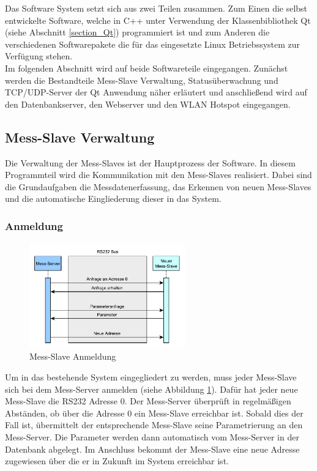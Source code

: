 Das Software System setzt sich aus zwei Teilen zusammen. Zum Einen die selbst entwickelte Software, welche in C++ unter Verwendung der Klassenbibliothek Qt (siehe Abschnitt \ref{section_Qt}) programmiert ist und zum Anderen die verschiedenen Softwarepakete die für das eingesetzte Linux Betriebssystem zur Verfügung stehen.\\
Im folgenden Abschnitt wird auf beide Softwareteile eingegangen. Zunächst werden die Bestandteile Mess-Slave Verwaltung, Statusüberwachung und TCP/UDP-Server der Qt Anwendung näher erläutert und anschließend wird auf den Datenbankserver, den Webserver und den WLAN Hotspot eingegangen.

\subsection{Mess-Slave Verwaltung}
\label{section_messclientverwaltung}
Die Verwaltung der Mess-Slaves ist der Hauptprozess der Software. In diesem Programmteil wird die Kommunikation mit den Mess-Slaves realisiert. Dabei sind die Grundaufgaben die Messdatenerfassung, das Erkennen von neuen Mess-Slaves und die automatische Eingliederung dieser in das System.

\subsubsection{Anmeldung}

\begin{figure}[H]
\begin{center}
\includegraphics[width=0.6\textwidth ]{img/general/MessClientAnmeldung.pdf}
\caption{Mess-Slave Anmeldung}
\label{figure_MessClientAnmeldung}
\end{center}
\end{figure}
 
 
Um in das bestehende System eingegliedert zu werden, muss jeder Mess-Slave sich bei dem Mess-Server anmelden (siehe Abbildung \ref{figure_MessClientAnmeldung}). Dafür hat jeder neue Mess-Slave die RS232 Adresse 0. Der Mess-Server überprüft in regelmäßigen Abständen, ob über die Adresse 0 ein Mess-Slave erreichbar ist. Sobald dies der Fall ist, übermittelt der entsprechende Mess-Slave seine Parametrierung an den Mess-Server. Die Parameter werden dann automatisch vom Mess-Server in der Datenbank abgelegt. Im Anschluss bekommt der Mess-Slave eine neue Adresse zugewiesen über die er in Zukunft im System erreichbar ist.


